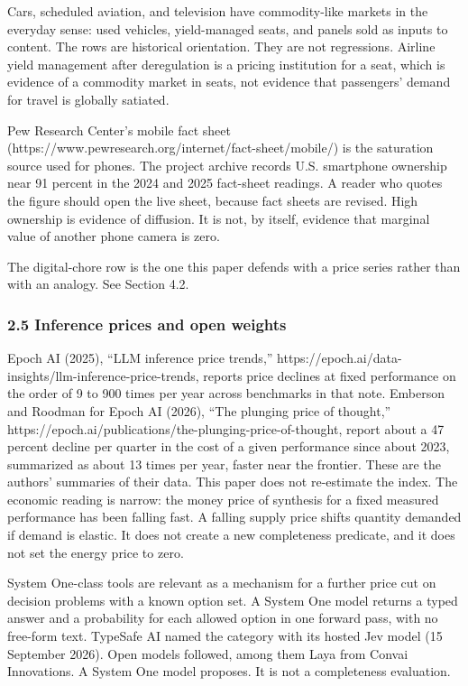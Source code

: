 \documentclass[
  10pt,
]{article}
\begin{document}
Cars, scheduled aviation, and television have commodity-like markets in
the everyday sense: used vehicles, yield-managed seats, and panels sold
as inputs to content. The rows are historical orientation. They are not
regressions. Airline yield management after deregulation is a pricing
institution for a seat, which is evidence of a commodity market in
seats, not evidence that passengers' demand for travel is globally
satiated.

Pew Research Center's mobile fact sheet
(https://www.pewresearch.org/internet/fact-sheet/mobile/) is the
saturation source used for phones. The project archive records U.S.
smartphone ownership near 91 percent in the 2024 and 2025 fact-sheet
readings. A reader who quotes the figure should open the live sheet,
because fact sheets are revised. High ownership is evidence of
diffusion. It is not, by itself, evidence that marginal value of another
phone camera is zero.

The digital-chore row is the one this paper defends with a price series
rather than with an analogy. See Section 4.2.

\subsubsection{2.5 Inference prices and open
weights}\label{inference-prices-and-open-weights}

Epoch AI (2025), ``LLM inference price trends,''
https://epoch.ai/data-insights/llm-inference-price-trends, reports price
declines at fixed performance on the order of 9 to 900 times per year
across benchmarks in that note. Emberson and Roodman for Epoch AI
(2026), ``The plunging price of thought,''
https://epoch.ai/publications/the-plunging-price-of-thought, report
about a 47 percent decline per quarter in the cost of a given
performance since about 2023, summarized as about 13 times per year,
faster near the frontier. These are the authors' summaries of their
data. This paper does not re-estimate the index. The economic reading is
narrow: the money price of synthesis for a fixed measured performance
has been falling fast. A falling supply price shifts quantity demanded
if demand is elastic. It does not create a new completeness predicate,
and it does not set the energy price to zero.

System One-class tools are relevant as a mechanism for a further price
cut on decision problems with a known option set. A System One model
returns a typed answer and a probability for each allowed option in one
forward pass, with no free-form text. TypeSafe AI named the category
with its hosted Jev model (15 September 2026). Open models followed,
among them Laya from Convai Innovations. A System One model proposes. It
is not a completeness evaluation.
\end{document}
